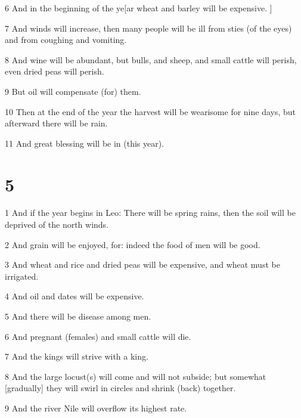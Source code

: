 \par 6 And in the beginning of the ye[ar wheat and barley will be expensive. ]

\par 7 And winds will increase, then many people will be ill from sties (of the eyes) and from coughing and vomiting.

\par 8 And wine will be abundant, but bulls, and sheep, and small cattle will perish, even dried peas will perish. 

\par 9 But oil will compensate (for) them. 

\par 10 Then at the end of the year the harvest will be wearisome for nine days, but afterward there will be rain. 

\par 11 And great blessing will be in (this year). 


\chapter{5}

\par 1 And if the year begins in Leo: There will be spring rains, then the soil will be deprived of the north winds. 

\par 2 And grain will be enjoyed, for: indeed the food of men will be good. 

\par 3 And wheat and rice and dried peas will be expensive, and wheat must be irrigated. 

\par 4 And oil and dates will be expensive. 

\par 5 And there will be disease among men. 

\par 6 And pregnant (females) and small cattle will die. 

\par 7 And the kings will strive with a king. 

\par 8 And the large locust(s) will come and will not subside; but somewhat [gradually] they will swirl in circles and shrink (back) together.

\par 9 And the river Nile will overflow its highest rate.

